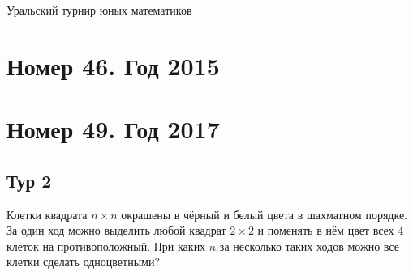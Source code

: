 \documentclass[11pt, a4paper]{common/document_template}
\begin{document}
\begin{titlepage}
  \begin{center}
	\Huge{Уральский турнир юных математиков}
  \end{center}
\end{titlepage}

\chapter{Номер 46. Год 2015}


\chapter{Номер 49. Год 2017}

\section{Тур 2}

\begin{exercise}
Клетки квадрата $n \times n$ окрашены в чёрный и белый цвета в шахматном порядке. За один ход можно выделить любой квадрат $2 \times 2$ и поменять в нём цвет всех 4 клеток на противоположный. При каких $n$ за несколько таких ходов можно все клетки сделать одноцветными?
\end{exercise}
\end{document}
